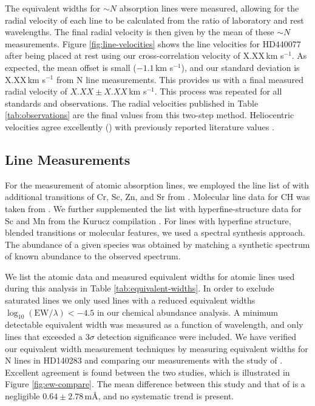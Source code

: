\documentclass{emulateapj}
\begin{document}
The equivalent widths for $\sim{}N$ absorption lines were measured, allowing for the radial velocity of each line to be calculated from the ratio of laboratory and rest wavelengths. The final radial velocity is then given by the mean of these $\sim{}N$ measurements. Figure \ref{fig:line-velocities} shows the line velocities for HD440077 after  being placed at rest using our cross-correlation velocity of X.XX\,km s$^{-1}$. As expected, the mean offset is small ($-1.1$\,km s$^{-1}$), and our standard deviation is X.XX\,km s$^{-1}$ from N line measurements. This provides us with a final measured radial velocity of $X.XX \pm X.XX$\,km s$^{-1}$. This process was repeated for all standards and observations. The radial velocities published in Table \ref{tab:observations} are the final values from this two-step method. Heliocentric velocities agree excellently () with previously reported literature values \citep{Williams;wylie-de_boer;2012}.

\subsection{Line Measurements}
\label{sec:line-measurements}

For the measurement of atomic absorption lines, we employed the line list of \citet{Yong;et-al_2009} with additional transitions of Cr, Sc, Zn, and Sr from \citet{Frebel;et-al_2009}. Molecular line data for CH was taken from \citet{Plez;et-al_2008,Plez;et-al_2009}. We further supplemented the list with hyperfine-structure data for Sc and Mn  from the Kurucz compilation \citet{Kurucz;1998}. For lines with hyperfine structure, blended transitions or molecular features, we used a spectral synthesis approach. The abundance of a given species was obtained by matching a synthetic spectrum of known abundance to the observed spectrum.

We list the atomic data and measured equivalent widths for atomic lines used during this analysis in Table \ref{tab:equivalent-widths}. In order to exclude saturated lines we only used lines with a reduced equivalent widths $\log_{10}{(\mbox{EW}/\lambda)} < -4.5$ in our chemical abundance analysis. A minimum detectable equivalent width was measured as a function of wavelength, and only lines that exceeded a $3\sigma$ detection significance were included. We have verified our equivalent width measurement techniques by measuring equivalent widths for N lines in HD140283 and comparing our measurements with the study of \citet{Norris;et-al_2000}. Excellent agreement is found between the two studies, which is illustrated in Figure \ref{fig:ew-compare}. The mean difference between this study and that of \cite{Norris;et-al_2000} is a negligible $0.64 \pm 2.78$\,m\AA{}, and no systematic trend is present.
\end{document}

